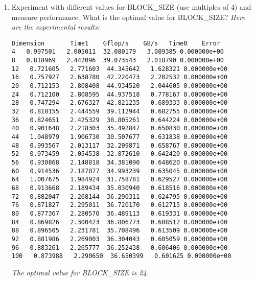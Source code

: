 \documentclass{article}
\begin{document}
\begin{enumerate}
\begin{enumerate}
\item  Experiment with different values for BLOCK\_SIZE (use multiples of 4) and measure performance.  What is the optimal value for BLOCK\_SIZE?
\textit{Here are the experimental results:}
\begin{verbatim}
Dimension       Time1    Gflop/s    GB/s   Time0    Error
4   0.997501   2.005011  32.080179   3.089385 0.000000e+00
8   0.818969   2.442096  39.073543   2.018790 0.000000e+00
12   0.721605   2.771603  44.345642   1.628321 0.000000e+00
16   0.757927   2.638780  42.220473   2.202532 0.000000e+00
20   0.712153   2.808408  44.934520   2.044605 0.000000e+00
24   0.712100   2.808595  44.937518   0.778167 0.000000e+00
28   0.747294   2.676327  42.821235   0.689333 0.000000e+00
32   0.818155   2.444559  39.112944   0.682755 0.000000e+00
36   0.824651   2.425329  38.805261   0.644224 0.000000e+00
40   0.901648   2.218303  35.492847   0.650830 0.000000e+00
44   1.048979   1.906730  30.507677   0.631838 0.000000e+00
48   0.993567   2.013117  32.209871   0.658767 0.000000e+00
52   0.973459   2.054538  32.872610   0.642420 0.000000e+00
56   0.930868   2.148818  34.381090   0.648620 0.000000e+00
60   0.914536   2.187077  34.993239   0.635045 0.000000e+00
64   1.007675   1.984924  31.758781   0.629527 0.000000e+00
68   0.913668   2.189434  35.030940   0.618516 0.000000e+00
72   0.882047   2.268144  36.290311   0.624795 0.000000e+00
76   0.871827   2.295011  36.720170   0.612715 0.000000e+00
80   0.877367   2.280570  36.489113   0.619331 0.000000e+00
84   0.869826   2.300423  36.806773   0.608512 0.000000e+00
88   0.896505   2.231781  35.708496   0.613509 0.000000e+00
92   0.881986   2.269003  36.304043   0.605059 0.000000e+00
96   0.883261   2.265777  36.252438   0.606406 0.000000e+00
100   0.873988   2.290650  36.650399   0.601625 0.000000e+00
\end{verbatim}
\textit{The optimal value for BLOCK\_SIZE is 24.}


\end{enumerate}
\end{enumerate}
\end{document}

